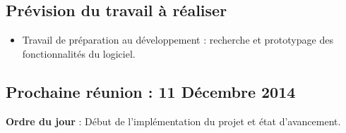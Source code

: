 \documentclass[12pt,a4paper]{article}
\begin{document}
\subsection*{Prévision du travail à réaliser}

\begin{itemize}[label = $\blacktriangleright$]
\item Travail de préparation au développement : recherche et prototypage des fonctionnalités du logiciel.
\end{itemize}

\subsection*{Prochaine réunion : 11 Décembre 2014}

\textbf{Ordre du jour} : Début de l'implémentation du projet et état d'avancement.\\
\end{document}
